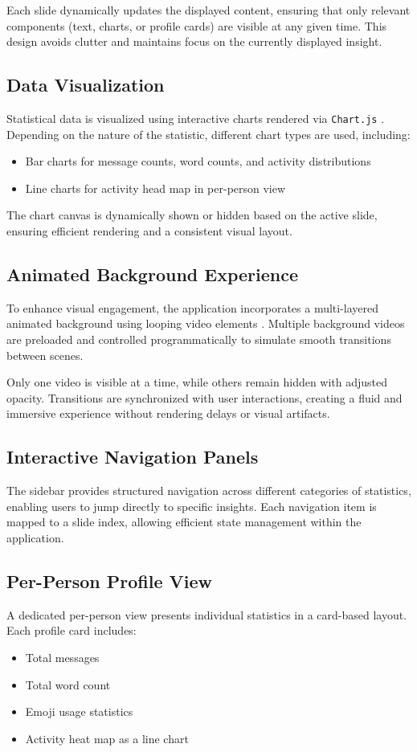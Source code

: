 \documentclass[11pt,a4paper]{article}
\begin{document}
Each slide dynamically updates the displayed content, ensuring that only relevant components (text, charts, or profile cards) are visible at any given time. This design avoids clutter and maintains focus on the currently displayed insight.

\subsection{Data Visualization}
Statistical data is visualized using interactive charts rendered via \texttt{Chart.js} \cite{chartjs}. Depending on the nature of the statistic, different chart types are used, including:
\begin{itemize}
\item Bar charts for message counts, word counts, and activity distributions
\item Line charts for activity head map in per-person view
\end{itemize}

The chart canvas is dynamically shown or hidden based on the active slide, ensuring efficient rendering and a consistent visual layout.

\subsection{Animated Background Experience}
To enhance visual engagement, the application incorporates a multi-layered animated background using looping video elements \cite{videohtml,codepen_bg}. Multiple background videos are preloaded and controlled programmatically to simulate smooth transitions between scenes.

Only one video is visible at a time, while others remain hidden with adjusted opacity. Transitions are synchronized with user interactions, creating a fluid and immersive experience without rendering delays or visual artifacts.

\subsection{Interactive Navigation Panels}
The sidebar provides structured navigation across different categories of statistics, enabling users to jump directly to specific insights. Each navigation item is mapped to a slide index, allowing efficient state management within the application.

\subsection{Per-Person Profile View}
A dedicated per-person view presents individual statistics in a card-based layout. Each profile card includes:
\begin{itemize}
\item Total messages
\item Total word count
\item Emoji usage statistics
\item Activity heat map as a line chart
\end{itemize}
\end{document}

